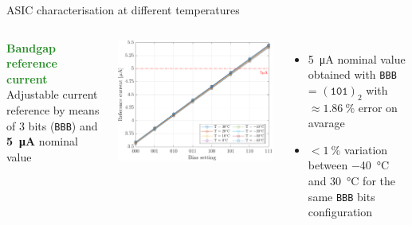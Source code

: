 \documentclass[aspectratio=169,xcolor=dvipsnames]{beamer} %
\newcommand{\greencheck}{{\color{ForestGreen}\checkmark}}
\begin{document}
\begin{frame}{ASIC characterisation at different temperatures}
\begin{columns}[T]
        \addtolength{\leftmargini}{\labelsep}
        \vskip0.3cm
        \fontsize{9pt}{1}\selectfont
        \textbf{\textcolor{ForestGreen}{Bandgap reference current}}\\
        \vskip0.15cm
        \fontsize{8.5pt}{1}\selectfont
        Adjustable current reference by means of 3 bits (\texttt{BBB}) and \textbf{\SI{5}{\micro\ampere}} nominal value
        \vskip-0.4cm
        \begin{center}
            \includegraphics[height=0.5\textheight]{images/temperature_effects/BGR_current_XBBB.pdf}
        \end{center}
        \vskip-0.2cm
        \begin{itemize}
            \item \SI{5}{\micro\ampere} nominal value obtained with \texttt{BBB} = $(\texttt{101})_{2}$ with \textbf{$\approx\SI{1.86}{\percent}$} error on avarage \greencheck 
            \item \textbf{$< \SI{1}{\percent}$} variation between \SI{-40}{\celsius} and \SI{30}{\celsius} for the same \texttt{BBB} bits configuration \greencheck
        \end{itemize}
    \end{columns}
\end{frame}


\end{document}
